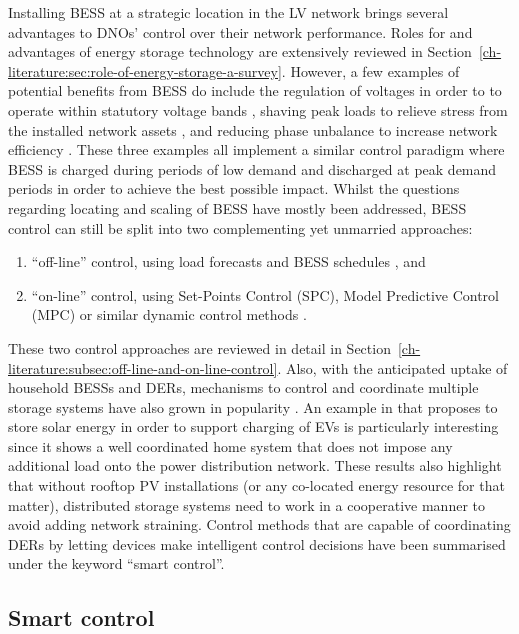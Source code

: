 Installing BESS at a strategic location in the LV network brings several advantages to DNOs' control over their network performance.
Roles for and advantages of energy storage technology are extensively reviewed in Section~\ref{ch-literature:sec:role-of-energy-storage-a-survey}.
However, a few examples of potential benefits from BESS do include the regulation of voltages in order to to operate within statutory voltage bands \cite{Yang2014}, shaving peak loads to relieve stress from the installed network assets \cite{Bennett2015}, and reducing phase unbalance to increase network efficiency \cite{Wang2015b}.
These three examples all implement a similar control paradigm where BESS is charged during periods of low demand and discharged at peak demand periods in order to achieve the best possible impact.
Whilst the questions regarding locating and scaling of BESS have mostly been addressed, BESS control can still be split into two complementing yet unmarried approaches:

\begin{enumerate}
	\item ``off-line'' control, using load forecasts and BESS schedules \cite{Cecati2011, Chaouachi2013, Palma-Behnke2013, Khodaei2014}, and
	\item ``on-line'' control, using Set-Points Control (SPC), Model Predictive Control (MPC) or similar dynamic control methods \cite{Salinas2013, Huang2013, Huang2014a, Sun2014a}.
\end{enumerate}

These two control approaches are reviewed in detail in Section~\ref{ch-literature:subsec:off-line-and-on-line-control}.
Also, with the anticipated uptake of household BESSs and DERs, mechanisms to control and coordinate multiple storage systems have also grown in popularity \cite{Mokhtari2013, Sarker2015, Baker2016a, Baumann2017}.
An example in \cite{Baumann2017} that proposes to store solar energy in order to support charging of EVs is particularly interesting since it shows a well coordinated home system that does not impose any additional load onto the power distribution network.
These results also highlight that without rooftop PV installations (or any co-located energy resource for that matter), distributed storage systems need to work in a cooperative manner to avoid adding network straining.
Control methods that are capable of coordinating DERs by letting devices make intelligent control decisions have been summarised under the keyword ``smart control''.

\subsection{Smart control}
\label{ch-introduction:subsec:smart-control}

